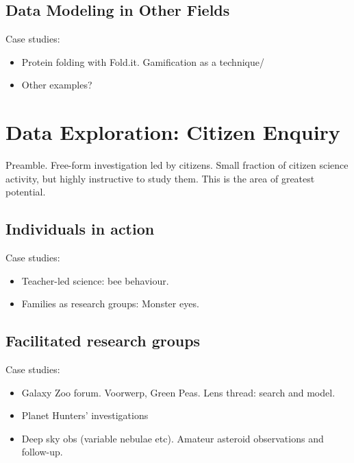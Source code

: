 \documentclass{ar2e}
\begin{document}

\subsection{Data Modeling in Other Fields}
\label{sec:model:astro}

Case studies:
\begin{itemize}
\item Protein folding with Fold.it. Gamification as a technique/
\item Other examples? 
\end{itemize}



\section{Data Exploration: Citizen Enquiry}
\label{sec:explore}

Preamble. Free-form investigation led by citizens. Small fraction of citizen
science activity, but highly instructive to study them. This is the area of
greatest potential.



\subsection{Individuals in action}
\label{sec:explore:individuals}

Case studies:
\begin{itemize}
\item Teacher-led science: bee behaviour. 
\item Families as research groups: Monster eyes. %
\end{itemize}



\subsection{Facilitated research groups}
\label{sec:explore:groups}

Case studies:
\begin{itemize}
\item Galaxy Zoo forum. Voorwerp, Green Peas. Lens thread: search and model.
\item Planet Hunters' investigations
\item Deep sky obs (variable nebulae etc). Amateur asteroid observations and follow-up.
\end{itemize}
\end{document}
